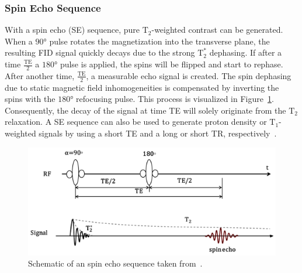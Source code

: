 \subsubsection{Spin Echo Sequence}
With a spin echo (SE) sequence, pure $\text{T}_2$-weighted contrast can be generated. When a $90°$ pulse rotates the magnetization into the transverse plane, the resulting FID signal quickly decays due to the strong $\text{T}^*_2$ dephasing. If after a time $\frac{\text{TE}}{2}$ a $180°$ pulse is applied, the spins will be flipped and start to rephase. After another time, $\frac{\text{TE}}{2}$, a measurable echo signal is created. The spin dephasing due to static magnetic field inhomogeneities is compensated by inverting the spins with the $180°$ refocusing pulse. This process is visualized in Figure~\ref{fig:SpinEcho}.\\
Consequently, the decay of the signal at time TE will solely originate from the $\text{T}_2$ relaxation. A SE sequence can also be used to generate proton density or $\text{T}_1$-weighted signals by using a short TE and a long or short TR, respectively~\cite{PulseSequences}.

\begin{figure}[htpb]
	\centering
	\graphicspath{{images/}{\main/images/}}
	\includegraphics[width=\linewidth]{SpinEcho.png} 
	\caption{Schematic of an spin echo sequence taken from~\cite{PulseSequences}.}
	\label{fig:SpinEcho}
\end{figure}


